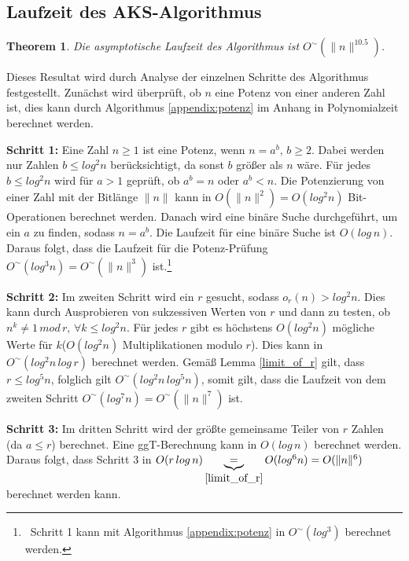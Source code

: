\documentclass[12pt,oneside]{article}
\newtheorem{theorem}{Theorem}[section]
\theoremstyle{remark}
\theoremstyle{definition}
\begin{document}
\subsection{Laufzeit des AKS-Algorithmus}
\begin{theorem}
Die asymptotische Laufzeit des Algorithmus ist $O^{\sim}(\lVert n \rVert^{10.5})$. 
\end{theorem}


Dieses Resultat wird durch Analyse der einzelnen Schritte des Algorithmus festgestellt. Zunächst wird überprüft, ob $n$ eine Potenz von einer anderen Zahl ist, dies kann durch Algorithmus \ref{appendix:potenz} im Anhang in Polynomialzeit berechnet werden.

\textbf{Schritt 1:}\newline
Eine Zahl $n \geq 1$ ist eine Potenz, wenn $ n  = a^b, \, b \geq 2$. Dabei werden nur Zahlen $b \leq log^2 n$ berücksichtigt, da sonst $b$ größer als $n$ wäre. Für jedes $b \leq log^2 n$ wird für $a > 1$ geprüft, ob $a^b = n$ oder $a^b < n$. Die Potenzierung von einer Zahl mit der Bitlänge $\lVert n \lVert$ kann in $O(\lVert n \rVert^2) = O(log^2 n)$ Bit-Operationen berechnet werden.%
Danach wird eine binäre Suche durchgeführt, um ein $a$ zu finden, sodass $ n = a^b$. Die Laufzeit für eine binäre Suche ist $O(log \, n)$. Daraus folgt, dass die Laufzeit für die Potenz-Prüfung $O^{\sim}(log^3 n) = O^{\sim}(\lVert n \rVert^3)$ ist.\footnote{$\,$ Schritt 1 kann mit Algorithmus \ref{appendix:potenz} in $O^{\sim}(log^3)$ berechnet werden.}\newline 


\textbf{Schritt 2:}\newline
Im zweiten Schritt wird ein $r$ gesucht, sodass $o_{r}(n) > log^2 n$. Dies kann durch Ausprobieren von sukzessiven Werten von $r$ und dann zu testen, ob $n^k \neq 1 \,  mod \, r, \, \forall k \leq log^2 n$. Für jedes $r$ gibt es höchstens $O(log^2 n)$ mögliche Werte für $k$($O(log^2n)$ Multiplikationen modulo $r$). Dies kann in $O^{\sim}(log^2 n \, log \, r)$ berechnet werden.\newline\newline
Gemäß Lemma \ref{limit_of_r} gilt, dass $ r \leq log^5 n$, folglich gilt $O^{\sim}(log^2 n \, log^5 n)$, somit gilt, dass die Laufzeit von dem zweiten Schritt $O^{\sim}(log^7 n) = O^{\sim}(\lVert n \rVert^7)$ ist. 


\textbf{Schritt 3:}\newline
Im dritten Schritt wird der größte gemeinsame Teiler von $r$ Zahlen (da $a \leq r$) berechnet. Eine ggT-Berechnung kann in $O(log \,n)$ berechnet werden\cite{D73}. Daraus folgt, dass Schritt 3 in $O(r \, log \, n) \underbrace{=}_{\ref{limit_of_r}} O(log^6 n) = O(\lVert n \rVert^6)$ berechnet werden kann. 
\end{document}
